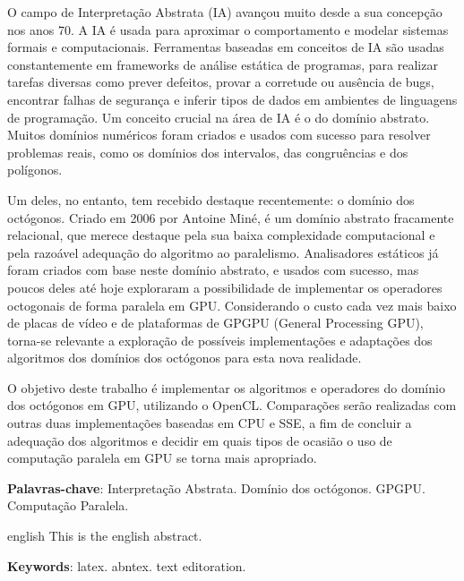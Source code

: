 

\setlength{\absparsep}{18pt} %
\begin{resumo}

O campo de Interpretação Abstrata (IA) avançou muito desde a sua concepção nos anos 70. A IA é usada para aproximar o comportamento e modelar sistemas formais e computacionais. Ferramentas baseadas em conceitos de IA são usadas constantemente em frameworks de análise estática de programas, para realizar tarefas diversas como prever defeitos, provar a corretude ou ausência de bugs, encontrar falhas de segurança e inferir tipos de dados em ambientes de linguagens de programação. Um conceito crucial na área de IA é o do domínio abstrato. Muitos domínios numéricos foram criados e usados com sucesso para resolver problemas reais, como os domínios dos intervalos, das congruências e dos polígonos.

Um deles, no entanto, tem recebido destaque recentemente: o domínio dos octógonos. Criado em 2006 por Antoine Miné, é um domínio abstrato fracamente relacional, que merece destaque pela sua baixa complexidade computacional e pela razoável adequação do algoritmo ao paralelismo. Analisadores estáticos já foram criados com base neste domínio abstrato, e usados com sucesso, mas poucos deles até hoje exploraram a possibilidade de implementar os operadores octogonais de forma paralela em GPU. Considerando o custo cada vez mais baixo de placas de vídeo e de plataformas de GPGPU (General Processing GPU), torna-se relevante a exploração de possíveis implementações e adaptações dos algoritmos dos domínios dos octógonos para esta nova realidade.

O objetivo deste trabalho é implementar os algoritmos e operadores do domínio dos octógonos em GPU, utilizando o OpenCL. Comparações serão realizadas com outras duas implementações baseadas em CPU e SSE, a fim de concluir a adequação dos algoritmos e decidir em quais tipos de ocasião o uso de computação paralela em GPU se torna mais apropriado.

\vspace{\onelineskip}

\textbf{Palavras-chave}: Interpretação Abstrata. Domínio dos octógonos. GPGPU. Computação Paralela.
\end{resumo}

\begin{resumo}[Abstract]
 \begin{otherlanguage*}{english}
   This is the english abstract.

   \vspace{\onelineskip}
 
   \noindent 
   \textbf{Keywords}: latex. abntex. text editoration.
 \end{otherlanguage*}
\end{resumo}

